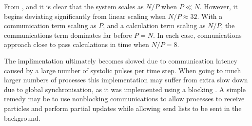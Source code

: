 \vZeroTimeExplanation
{}
{}
{}
{\pairoperation{}}
{\systolicloop{}}

%
From
,
 and
it is clear that the system scales as $N/P$ when $P \ll{} N$.
%
However, it begins deviating significantly from linear scaling
when $N/P \approx{} 32$.
%
With a communication term scaling as $P$, and a calculation term
scaling as $N/P$, the communications term dominates far before $P = N$.
%
In each case, connunications approach close to pass calculations in time
when $N/P = 8$.

The implimentation ultimately becomes slowed due to
communication latency caused by a large number
of systolic pulses per time step.
%
When going to much larger numbers of processes
this implementation may suffer from extra slow down due to
global synchronisation, as it was implemented using a blocking
\mpisendrecv{}.
%
A simple remedy may be to use nonblocking communications to allow
processes to receive particles and perform partial updates while
allowing send lists to be sent in the background.
